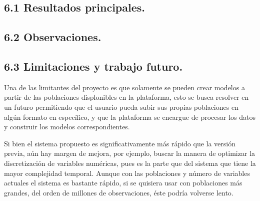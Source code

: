\documentclass[
 12pt,
 letterpaper,
]{article}
\theoremstyle{teoremaBreak}
\theoremstyle{plain}
\theoremstyle{definition}
\begin{document}
\subsection{6.1 Resultados principales.}
\subsection{6.2 Observaciones.}
\subsection{6.3 Limitaciones y trabajo futuro.}

Una de las limitantes del proyecto es que solamente se pueden crear modelos a partir 
de las poblaciones displonibles en la plataforma, esto se busca resolver en un futuro permitiendo que el usuario pueda 
subir sus propias poblaciones en algún formato en específico, y que la plataforma se encargue de procesar los datos y construir 
los modelos correspondientes.

Si bien el sistema propuesto es significativamente más rápido que la versión previa, aún hay margen de mejora, por ejemplo, 
buscar la manera de optimizar la discretización de variables numéricas, pues es la parte que del sistema que tiene la mayor 
complejidad temporal.
Aunque con las poblaciones y número de variables actuales el sistema es bastante rápido, si se quisiera usar con poblaciones más 
grandes, del orden de millones de observaciones, éste podría volverse lento.
\end{document}

